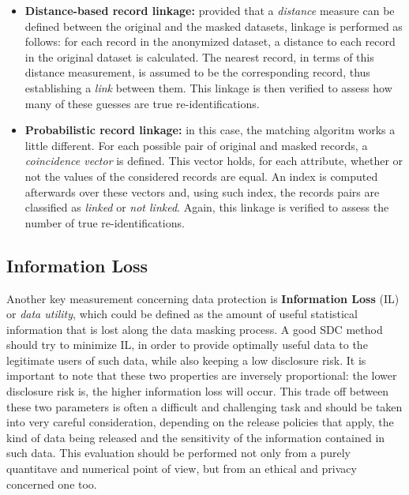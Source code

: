 \begin{itemize}
	\item \textbf{Distance-based record linkage:} provided that a \textit{distance} measure can be defined between the original and the masked datasets, linkage is performed as follows: for each record in the anonymized dataset, a distance to each record in the original dataset is calculated. The nearest record, in terms of this distance measurement, is assumed to be the corresponding record, thus establishing a \textit{link} between them. This linkage is then verified to assess how many of these guesses are true re-identifications.
	
	\item \textbf{Probabilistic record linkage:} in this case, the matching algoritm works a little different. For each possible pair of original and masked records, a \textit{coincidence vector} is defined. This vector holds, for each attribute, whether or not the values of the considered records are equal. An index is computed afterwards over these vectors and, using such index, the records pairs are classified as \textit{linked} or \textit{not linked}. Again, this linkage is verified to assess the number of true re-identifications.
\end{itemize}

\subsection{Information Loss}
\label{Theory::SDC::InfoLoss}

Another key measurement concerning data protection is \textbf{Information Loss} (IL) or \textit{data utility}, which could be defined as the amount of useful statistical information that is lost along the data masking process. A good SDC method should try to minimize IL, in order to provide optimally useful data to the legitimate users of such data, while also keeping a low disclosure risk. It is important to note that these two properties are inversely proportional: the lower disclosure risk is, the higher information loss will occur. This trade off between these two parameters is often a difficult and challenging task and should be taken into very careful consideration, depending on the release policies that apply, the kind of data being released and the sensitivity of the information contained in such data. This evaluation should be performed not only from a purely quantitave and numerical point of view, but from an ethical and privacy concerned one too.

